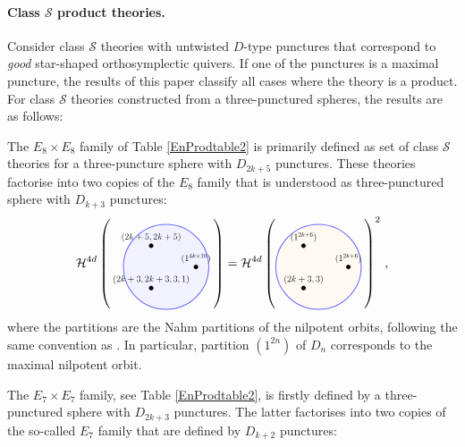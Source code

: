 \documentclass[a4paper,11pt]{article}
\begin{document}
\paragraph{Class $\mathcal{S}$ product theories.}
Consider class $\mathcal{S}$ theories with untwisted $D$-type punctures that correspond to \emph{good} star-shaped orthosymplectic quivers. If one of the punctures is a maximal puncture, the results of this paper classify all cases where the theory is a product. For class $\mathcal{S}$ theories constructed from a three-punctured spheres, the results are as follows:
\begin{compactitem}
\item The $E_8\times E_8$ family of Table \ref{EnProdtable2} is primarily defined as set of class $\mathcal{S}$ theories for a three-puncture sphere with $D_{2k+5}$ punctures. These theories factorise into two copies of the $E_8$ family that is understood as three-punctured sphere with $D_{k+3}$ punctures: 
\begin{equation}
   \mathcal{H}^{4d} \left( \raisebox{-.5\height}{\scalebox{.6}{\begin{tikzpicture}
        \filldraw[color=blue!60, fill=blue!5, very thick](0,0) circle (2);
        \filldraw[fill=black!100] (1.4,0) circle (.1);
        \filldraw[fill=black!100] (-.7,1) circle (.1);
        \filldraw[fill=black!100] (-.7,-1) circle (.1);
        \node at (1.4,.4) {\large $(1^{4k+10})$};
        \node at (-.7,1.4) {\large$(2k+5,2k+5)$};
        \node at (-.7,-.6) {\large$(2k+3,2k+3,3,1)$};
    \end{tikzpicture}}} \right) =  \mathcal{H}^{4d} \left( \raisebox{-.5\height}{\scalebox{.6}{\begin{tikzpicture}
        \filldraw[color=blue!60, fill=orange!5, very thick](0,0) circle (2);
        \filldraw[fill=black!100] (1.4,0) circle (.1);
        \filldraw[fill=black!100] (-.7,1) circle (.1);
        \filldraw[fill=black!100] (-.7,-1) circle (.1);
        \node at (1.4,.4) {\large $(1^{2k+6})$};
        \node at (-.7,1.4) {\large$(1^{2k+6})$};
        \node at (-.7,-.6) {\large$(2k+3,3)$};
    \end{tikzpicture}}} \right)^2 \,,
    \label{eq:class-S_E8xE8}
\end{equation}
where the partitions are the Nahm partitions of the nilpotent orbits, following the same convention as \cite{Distler:2017xba,Distler:2018gbc}. In particular,  partition $(1^{2n})$ of $D_n$ corresponds to the maximal nilpotent orbit.
%
\item The $E_7\times E_7$ family, see Table \ref{EnProdtable2}, is firstly defined by a three-punctured sphere with $D_{2k+3}$ punctures. The latter factorises into two copies of the so-called $E_7$ family that are defined by $D_{k+2}$ punctures:

\end{compactitem}
\end{document}
